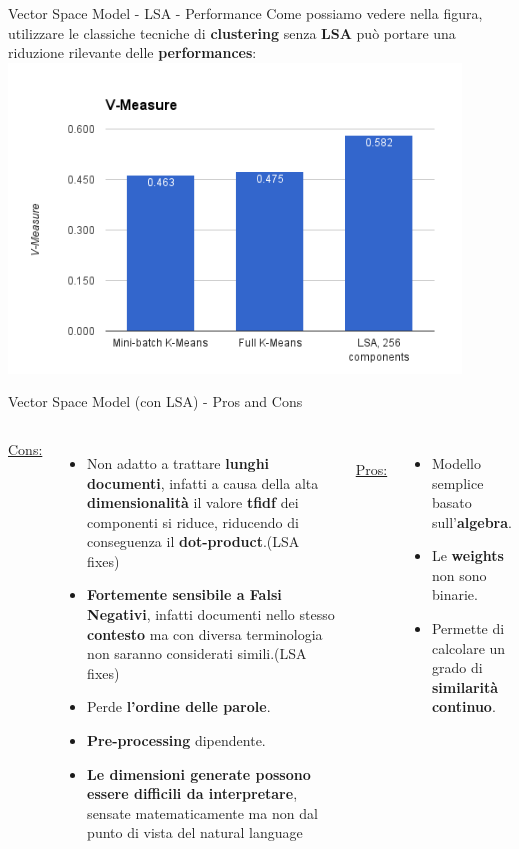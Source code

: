 \documentclass[british]{beamer}
\begin{document}
\begin{frame}{Vector Space Model - LSA - Performance}
	Come possiamo vedere nella figura, utilizzare le classiche tecniche di \textbf{clustering} senza \textbf{LSA} pu\`{o} portare una riduzione rilevante delle \textbf{performances}:
	\includegraphics[width=0.9\textwidth, height=0.7\textheight]{./Imgs/LSAperf}
\end{frame}

\begin{frame}{Vector Space Model (con LSA) - Pros and Cons}	
	\begin{columns}
		\underline{Cons:}
		\begin{itemize}
			\item Non adatto a trattare \textbf{lunghi documenti}, infatti a causa della alta \textbf{dimensionalit\`{a}} il valore \textbf{tfidf} dei componenti si riduce, riducendo di conseguenza il \textbf{dot-product}.(\alert{LSA fixes})
			\item \textbf{Fortemente sensibile a Falsi Negativi}, infatti documenti nello stesso \textbf{contesto} ma con diversa terminologia non saranno considerati simili.(\alert{LSA fixes})
			\item \alert{Perde \textbf{l'ordine delle parole}}.
			\item \textbf{Pre-processing} dipendente.
			\item \textbf{\alert{Le dimensioni generate possono essere difficili da interpretare}}, sensate matematicamente ma non dal punto di vista del natural language
		\end{itemize}
		\\
		\underline{Pros:}
		\begin{itemize}
			\item Modello semplice basato sull'\textbf{algebra}.
			\item Le \textbf{weights} non sono binarie.
			\item Permette di calcolare un grado di \textbf{similarit\`{a} continuo}.
		\end{itemize}
	\end{columns}
\end{frame}
\end{document}
